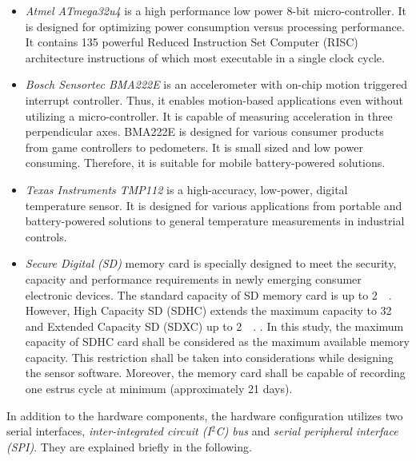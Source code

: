\documentclass[english,12pt,a4paper,pdftex,elec,utf8]{aaltothesis}
\begin{document}
\begin{itemize}
\item \textit{Atmel ATmega32u4} is a high performance low power 8-bit micro-controller. It is designed for optimizing power consumption versus processing performance. It contains 135 powerful Reduced Instruction Set Computer (RISC) architecture instructions of which most executable in a single clock cycle.  \cite{atmega32u4datasheet} 

\item \textit{Bosch Sensortec BMA222E} is an accelerometer with on-chip motion triggered interrupt controller. Thus, it enables motion-based applications even without utilizing a micro-controller. It is capable of measuring acceleration in three perpendicular axes. BMA222E is designed for various consumer products from game controllers to pedometers. It is small sized and low power consuming. Therefore, it is suitable for mobile battery-powered solutions.  \cite{bma222datasheet} 

\item \textit{Texas Instruments TMP112} is a high-accuracy, low-power, digital temperature sensor. It is designed for various applications from portable and battery-powered solutions to general temperature measurements in industrial controls. \cite{tmp112datasheet} 

\item \textit{Secure Digital (SD)} memory card is specially designed to meet the security, capacity and performance requirements in newly emerging consumer electronic devices. The standard capacity of SD memory card is up to \SI{2}{\giga\byte}. However, High Capacity SD (SDHC) extends the maximum capacity to \SI{32}{\giga\byte} and Extended Capacity SD (SDXC) up to \SI{2}{\tera\byte}. \cite{sdspecification}. In this study, the maximum capacity of SDHC card shall be considered as the maximum available memory capacity. This restriction shall be taken into considerations while designing the sensor software. Moreover, the memory card shall be capable of recording one estrus cycle at minimum (approximately 21 days).

\end{itemize} In addition to the hardware components, the hardware configuration utilizes two serial interfaces, \textit{inter-integrated circuit (I$^2$C) bus} and \textit{serial peripheral interface (SPI)}. They are explained briefly in the following.
\end{document}
